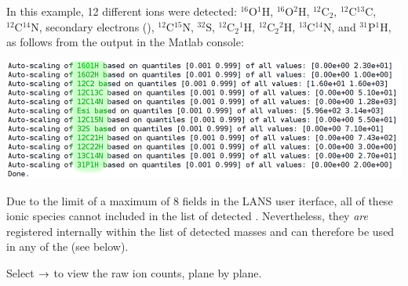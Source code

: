 \nb\bul In this example, 12 different ions were detected: ${}^{16}\mathrm{O}{}^1\mathrm{H}$, ${}^{16}\mathrm{O}{}^2\mathrm{H}$, ${}^{12}\mathrm{C}_2$, ${}^{12}\mathrm{C}{}^{13}\mathrm{C}$, ${}^{12}\mathrm{C}{}^{14}\mathrm{N}$, secondary electrons (), ${}^{12}\mathrm{C}{}^{15}\mathrm{N}$, ${}^{32}\mathrm{S}$, ${}^{12}\mathrm{C}_2{}^{1}\mathrm{H}$, ${}^{12}\mathrm{C}_2{}^{2}\mathrm{H}$, ${}^{13}\mathrm{C}{}^{14}\mathrm{N}$, and ${}^{31}\mathrm{P}{}^{1}\mathrm{H}$, as follows from the output in the Matlab console:
\begin{center}
\includegraphics[scale=0.34]{figs8/LANS-8plus-autoscale}
\end{center}

\bul Due to the limit of a maximum of 8 fields in the LANS user iterface, all of these ionic species cannot included in the list of detected . Nevertheless, they \emph{are} registered internally within the list of detected masses and can therefore be used in any of the  (see below).

\s Select  $\rightarrow$  to view the raw ion counts, plane by plane.

